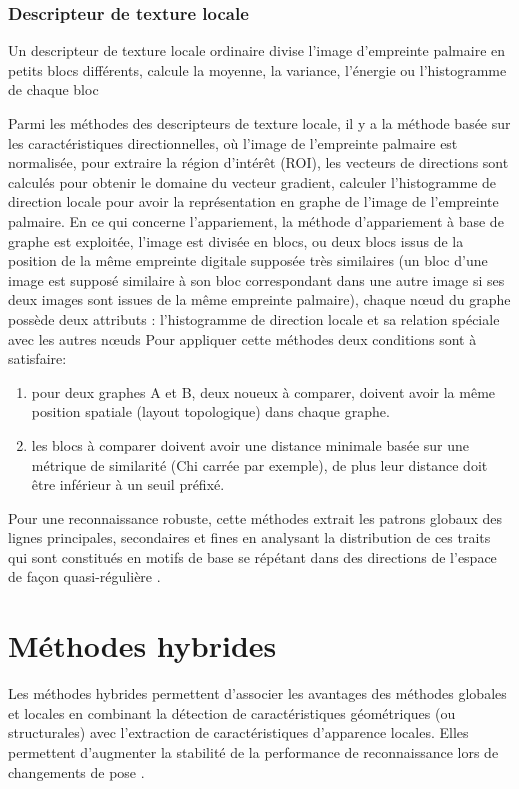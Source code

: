 \subsubsection{Descripteur de texture locale}
Un descripteur de texture locale ordinaire divise l'image d'empreinte palmaire en petits blocs différents, calcule la moyenne, la variance, l'énergie ou l'histogramme de chaque bloc

Parmi les méthodes des descripteurs de texture locale, il y a la méthode basée sur les caractéristiques directionnelles, où l'image de l'empreinte palmaire est normalisée, pour extraire la région d'intérêt (ROI), les vecteurs de directions sont calculés pour obtenir le domaine du vecteur gradient, calculer l'histogramme de direction locale pour avoir la représentation en graphe de l'image de l'empreinte palmaire.
En ce qui concerne l’appariement, la méthode d’appariement à base de graphe est exploitée, l’image est divisée en blocs, ou deux blocs issus de la position de la même empreinte digitale supposée très similaires (un bloc d’une image est supposé similaire à son bloc correspondant dans une autre image si ses deux images sont issues de la même empreinte palmaire), chaque nœud du graphe possède deux attributs : l’histogramme de direction locale et sa relation spéciale avec les autres nœuds
Pour appliquer cette méthodes deux conditions sont à satisfaire:
\begin{enumerate}
	\item pour deux graphes A et B, deux noueux à comparer, doivent avoir la même position spatiale (layout topologique) dans chaque graphe.
	\item les blocs à comparer doivent avoir une distance minimale basée sur une métrique de similarité (Chi carrée par exemple), de plus leur distance doit être inférieur à un seuil préfixé.
\end{enumerate}
	Pour une reconnaissance robuste, cette méthodes extrait les patrons globaux des lignes principales, secondaires et fines en analysant la distribution de ces traits qui sont constitués en motifs de base se répétant dans des directions de l’espace de façon quasi-régulière \citep{arbab2015forensic}.
\section{Méthodes hybrides}

 Les méthodes hybrides permettent d’associer les avantages des méthodes globales et locales en combinant la détection de caractéristiques géométriques (ou structurales) avec l’extraction de caractéristiques d’apparence locales. Elles permettent d’augmenter la stabilité de la performance de reconnaissance lors de changements de pose \citep{meyer2009}.

